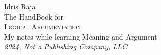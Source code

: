 \begin{titlepage}
	\raggedleft
	{\Large Idris Raja\\[1in]}
	{\large The HandBook for\\}
	{\Huge\scshape Logical Argumentation\\[.2in]}
	{\large My notes while learning Meaning and Argument\\}
	\vfill
	{\itshape 2024, Not a Publishing Company, LLC}
\end{titlepage}
